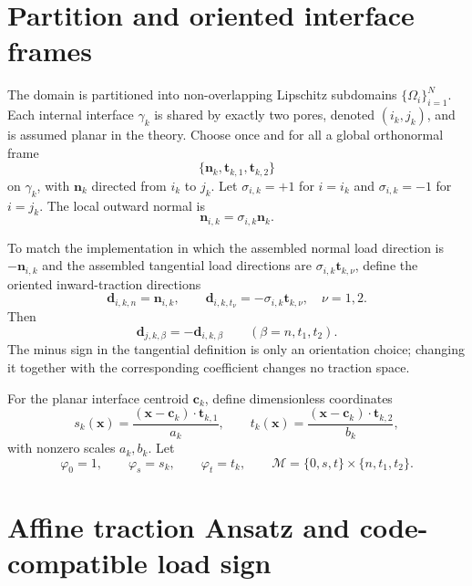 \documentclass[11pt,a4paper]{article}
\newcommand{\pore}[1]{\Omega_{#1}}
\newcommand{\iface}{\gamma}
\newcommand{\normal}{\bm{n}}
\newcommand{\modeset}{\mathcal{M}}
\begin{document}
\section{Partition and oriented interface frames}

The domain is partitioned into non-overlapping Lipschitz subdomains
$\{\pore{i}\}_{i=1}^N$.  Each internal interface $\iface_k$ is shared by
exactly two pores, denoted $(i_k,j_k)$, and is assumed planar in the theory.
Choose once and for all a global orthonormal frame
\[
 \{\normal_k,\bm t_{k,1},\bm t_{k,2}\}
\]
on $\iface_k$, with $\normal_k$ directed from $i_k$ to $j_k$.  Let
$\sigma_{i,k}=+1$ for $i=i_k$ and $\sigma_{i,k}=-1$ for $i=j_k$.  The local
outward normal is
\[
 \normal_{i,k}=\sigma_{i,k}\normal_k.
\]

To match the implementation in which the assembled normal load direction is
$-\normal_{i,k}$ and the assembled tangential load directions are
$\sigma_{i,k}\bm t_{k,\nu}$, define the oriented inward-traction directions
\begin{equation}\label{eq:oriented-directions}
 \bm d_{i,k,n}=\normal_{i,k},\qquad
 \bm d_{i,k,t_\nu}=-\sigma_{i,k}\bm t_{k,\nu},\quad \nu=1,2.
\end{equation}
Then
\[
 \bm d_{j,k,\beta}=-\bm d_{i,k,\beta}
 \qquad (\beta=n,t_1,t_2).
\]
The minus sign in the tangential definition is only an orientation choice;
changing it together with the corresponding coefficient changes no traction
space.

For the planar interface centroid $\bm c_k$, define dimensionless coordinates
\begin{equation}\label{eq:coords}
 s_k(\bm x)=\frac{(\bm x-\bm c_k)\cdot\bm t_{k,1}}{a_k},\qquad
 t_k(\bm x)=\frac{(\bm x-\bm c_k)\cdot\bm t_{k,2}}{b_k},
\end{equation}
with nonzero scales $a_k,b_k$.  Let
\[
 \varphi_0=1,\qquad \varphi_s=s_k,\qquad \varphi_t=t_k,
 \qquad
 \modeset=\{0,s,t\}\times\{n,t_1,t_2\}.
\]

\section{Affine traction Ansatz and code-compatible load sign}
\end{document}
